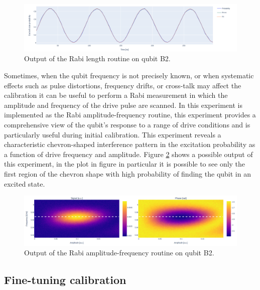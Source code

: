 \begin{figure}[h!]
    \centering
    \includegraphics[width=\textwidth]{figures/png/rabi_length.png}
    \caption{Output of the Rabi length routine on qubit B2.}
    \label{fig:rabi_length}
\end{figure}


Sometimes, when the qubit frequency is not precisely known, or when systematic effects such as pulse distortions, frequency drifts, or cross-talk may affect the calibration it can be useful to perform a Rabi measurement in which the amplitude and frequency of the drive pulse are scanned.
In \Qibocal this experiment is implemented as the Rabi amplitude-frequency routine, this experiment provides a comprehensive view of the qubit's response to a range of drive conditions and is particularly useful during initial calibration.
This experiment reveals a characteristic chevron-shaped interference pattern in the excitation probability as a function of drive frequency and amplitude. 
Figure \ref{fig:rabi_amplitude_frequency} shows a possible output of this experiment, in the plot in figure in particular it is possible to see only the first region of the chevron shape with high probability of finding the qubit in an excited state.

\begin{figure}[h!]
    \centering
    \includegraphics[width=\textwidth]{figures/png/rabi_af.png}
    \caption{Output of the Rabi amplitude-frequency routine on qubit B2.}
    \label{fig:rabi_amplitude_frequency}
\end{figure}

\subsection{Fine-tuning calibration}

